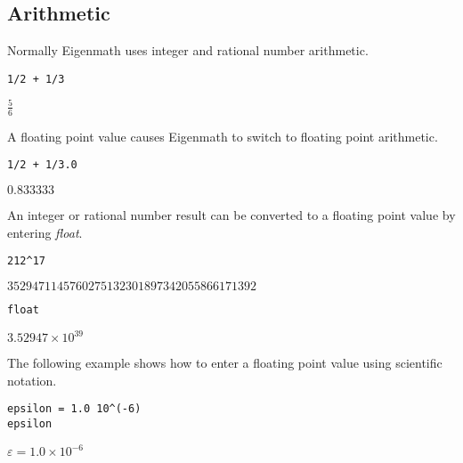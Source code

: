\subsection{Arithmetic}

\noindent
Normally Eigenmath uses integer and rational number arithmetic.

\begin{Verbatim}[formatcom=\color{blue}]
1/2 + 1/3
\end{Verbatim}

\noindent
$\displaystyle \tfrac{5}{6}$

\bigskip
\noindent
A floating point value causes Eigenmath to switch to floating point arithmetic.

\begin{Verbatim}[formatcom=\color{blue}]
1/2 + 1/3.0
\end{Verbatim}

\noindent
$\displaystyle 0.833333$

\bigskip
\noindent
An integer or rational number result can be converted to a floating
point value by entering {\it float}.

\begin{Verbatim}[formatcom=\color{blue}]
212^17
\end{Verbatim}

\noindent
$\displaystyle 3529471145760275132301897342055866171392$

\begin{Verbatim}[formatcom=\color{blue}]
float
\end{Verbatim}

\noindent
$\displaystyle 3.52947\times10^{39}$

\bigskip
\noindent
The following example shows how to enter a floating point value
using scientific notation.

\begin{Verbatim}[formatcom=\color{blue}]
epsilon = 1.0 10^(-6)
epsilon
\end{Verbatim}

\noindent
$\displaystyle \varepsilon=1.0\times10^{-6}$
